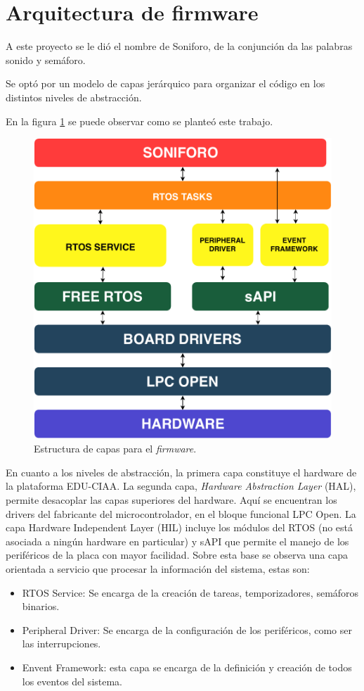 \section{Arquitectura de firmware}
A este proyecto se le dió el nombre de Soniforo, de la conjunción da las palabras sonido y semáforo.

Se optó por un modelo de capas jerárquico para organizar el código en los distintos niveles de abstracción.

En la figura \ref{fig:arquitecturaFirmwareGeneralSistema} se puede observar como se planteó este trabajo. 
\begin{figure}[h]
	\centering
	\includegraphics[scale=.5]{./Figures/arquitecturaGeneralSistema.pdf}
	\caption{Estructura de capas para el \textit{firmware}.}
	\label{fig:arquitecturaFirmwareGeneralSistema}
\end{figure}

En cuanto a los niveles de abstracción, la primera capa constituye el hardware de la plataforma EDU-CIAA. La segunda capa, \textit{Hardware Abstraction Layer} (HAL), permite desacoplar las capas superiores del hardware. Aquí se encuentran los
drivers del fabricante del microcontrolador, en el bloque funcional LPC Open. La capa Hardware Independent Layer (HIL) incluye los módulos del RTOS (no está asociada a ningún hardware en particular) y sAPI que permite el manejo de los periféricos de la placa con mayor facilidad.
Sobre esta base se observa una capa orientada a servicio que procesar la información del sistema, estas son: 
\begin{itemize}
\item RTOS Service: Se encarga de la creación de tareas, temporizadores, semáforos binarios.
\item Peripheral Driver: Se encarga de la configuración de los periféricos, como ser las interrupciones.
\item Envent Framework: esta capa se encarga de la definición y creación de todos los eventos del sistema.
\end{itemize}

